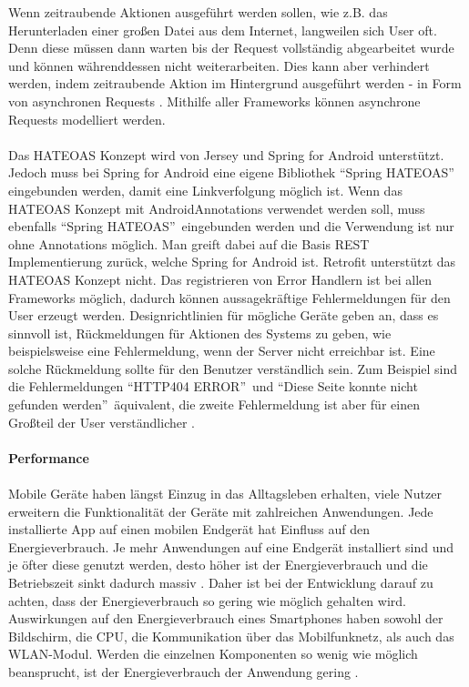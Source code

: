 Wenn zeitraubende Aktionen ausgeführt werden sollen, wie z.B. das Herunterladen einer großen Datei aus dem Internet, langweilen sich User oft. Denn diese müssen dann warten bis der Request vollständig abgearbeitet wurde und können währenddessen nicht weiterarbeiten. Dies kann aber verhindert werden, indem zeitraubende Aktion im Hintergrund ausgeführt werden - in Form von asynchronen Requests \cite{louis:android}. Mithilfe aller Frameworks können asynchrone Requests modelliert werden. 
\\\\
Das HATEOAS Konzept wird von Jersey und Spring for Android unterstützt. Jedoch muss bei Spring for Android eine eigene Bibliothek \textquotedblleft Spring HATEOAS\textquotedblright\, eingebunden werden, damit eine Linkverfolgung möglich ist. Wenn das HATEOAS Konzept mit AndroidAnnotations verwendet werden soll, muss ebenfalls \textquotedblleft Spring HATEOAS\textquotedblright\, eingebunden werden und die Verwendung ist nur ohne Annotations möglich. Man greift dabei auf die Basis REST Implementierung zurück, welche Spring for Android ist. Retrofit unterstützt das HATEOAS Konzept nicht.
\newpage
Das registrieren von Error Handlern ist bei allen Frameworks möglich, dadurch können aussagekräftige Fehlermeldungen für den User erzeugt werden. Designrichtlinien für mögliche Geräte geben an, dass es sinnvoll ist, Rückmeldungen für Aktionen des Systems zu geben, wie beispielsweise eine Fehlermeldung, wenn der Server nicht erreichbar ist. Eine solche Rückmeldung sollte für den Benutzer verständlich sein. Zum Beispiel sind die Fehlermeldungen \textquotedblleft HTTP404 ERROR\textquotedblright\, und \textquotedblleft Diese Seite konnte nicht gefunden werden\textquotedblright\, äquivalent, die zweite Fehlermeldung ist aber für einen Großteil der User verständlicher \cite{gong2004guidelines}.
\\\\
{\large \textbf{Performance}}\\\\
Mobile Geräte haben längst Einzug in das Alltagsleben erhalten, viele Nutzer erweitern die Funktionalität der Geräte mit zahlreichen Anwendungen. Jede installierte App auf einen mobilen Endgerät hat Einfluss auf den Energieverbrauch. Je mehr Anwendungen auf eine Endgerät installiert sind und je öfter diese genutzt werden, desto höher ist der Energieverbrauch und die Betriebszeit sinkt dadurch massiv \cite{Wil2012}. Daher ist bei der Entwicklung darauf zu achten, dass der Energieverbrauch so gering wie möglich gehalten wird. Auswirkungen auf den Energieverbrauch eines Smartphones haben sowohl der Bildschirm, die \acrfull{CPU}, die Kommunikation über das Mobilfunknetz, als auch das WLAN-Modul. Werden die einzelnen Komponenten so wenig wie möglich beansprucht, ist der Energieverbrauch der Anwendung gering \cite{vetter}. 
